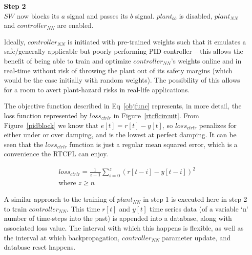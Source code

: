 \documentclass[10pt,twocolumn,letterpaper]{article}
\begin{document}
            \textbf{Step 2}\\
            $SW$ now blocks its $a$ signal and passes its $b$ signal. $plant_{bb}$ is disabled, $plant_{NN}$ and
            $controller_{NN}$ are enabled.
            
            Ideally, $controller_{NN}$ is initiated with pre-trained weights such that it emulates a safe/generally
            applicable but poorly performing PID controller -- this allows the benefit of being able to train and
            optimize $controller_{NN}$'s weights online and in real-time without risk of throwing the plant out of its
            safety margins (which would be the case initially with random weights). The possibility of this allows for a
            room to avert plant-hazard risks in real-life applications.

            The objective function described in Eq~\ref{objfunc} represents, in more detail, the loss function
            represented by $loss_{ctrlr}$ in Figure~\ref{rtcflcircuit}. From Figure~\ref{pidblock} we know that
            $e[t]=r[t]-y[t]$, so $loss_{ctrlr}$ penalizes for either under or over damping, and is the lowest at perfect
            damping. It can be seen that the $loss_{ctrlr}$ function is just a regular mean squared error, which is a
            convenience the RTCFL can enjoy. 

            \begin{equation} \label{objfunc}
                \begin{gathered}
                    loss_{ctrlr} = \frac{1}{z+1} \sum_{i=0}^z \left(r[t-i]-y[t-i]\right)^2 \\
                    \text{where } z\geq n
                \end{gathered}
            \end{equation}

            A similar approach to the training of $plant_{NN}$ in step 1 is executed here in step 2 to train
            $controller_{NN}$. This time $r[t]$ and $y[t]$ time series data (of a variable `n' number of time-steps into
            the past) is appended into a database, along with associated loss value. The interval with which this
            happens is flexible, as well as the interval at which backpropagation, $controller_{NN}$ parameter update,
            and database reset happens.
\end{document}
